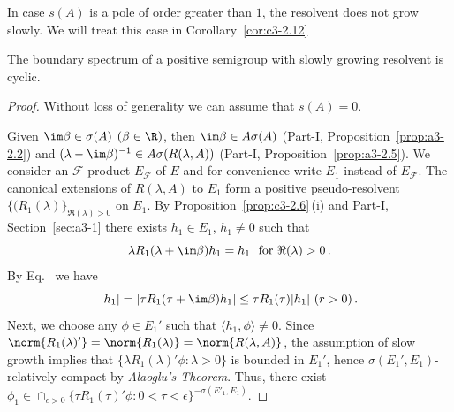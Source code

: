 In case $s(A)$ is a pole of order greater than $1$, the resolvent does not grow slowly.
We will treat this case in Corollary~\ref{cor:c3-2.12}
\begin{theorem}\label{thm:c3-2.10}
	The boundary spectrum of a positive semigroup with slowly growing resolvent is cyclic.
\end{theorem}
\begin{proof}
Without loss of generality we can assume that $s(A) = 0$.

Given $\im\beta \in \sigma(A)$ $(\beta \in \R )$, then $\im\beta \in A\sigma(A)$ (Part-I, Proposition~\ref{prop:a3-2.2}) and $(\lambda-\im\beta)^{-1} \in A\sigma(R(\lambda,A))$ (Part-I, Proposition~\ref{prop:a3-2.5}).
We consider an $\mathcal{F}$-product $E_{\mathcal{F}}$ of\/ $E$ and for convenience write $E_{1}$ instead of\/ $E_{\mathcal{F}}$.
The canonical extensions of\/ $R(\lambda,A)$ to $E_{1}$ form a positive pseudo-resolvent $\{(R_{1}(\lambda)\}_{\Re(\lambda)>0}$ on $E_{1}$.
By Proposition~\ref{prop:c3-2.6}\,(i) and Part-I, Section~\ref{sec:a3-1} there exists $h_{1} \in E_{1}$, $h_{1} \neq 0$ such that
\begin{equation}\textstyle\label{eq:c3-2.16}
	\lambda R_{1}(\lambda+\im\beta)h_{1} = h_{1} \ \text{ for }  \Re(\lambda) > 0\,.
\end{equation}
By Eq.~ we have
\begin{equation}\label{eq:c3-2.17}\textstyle
	|h_{1}| = |\tau R_{1}(\tau+\im\beta)h_{1}| \leq \tau R_{1}(\tau)|h_{1}| \ (r > 0)\,.
\end{equation}
Next, we choose any $\phi \in E_{1}'$ such that $\langle  h_{1},\phi \rangle \neq 0$.
Since $\norm{R_{1}(\lambda)'} = \norm{R_{1}(\lambda)} = \norm{R(\lambda,A)}$, the assumption of slow growth implies that $\{\lambda R_{1}(\lambda)'\phi \colon \lambda > 0\}$ is bounded in $E_{1}'$, hence $\sigma(E_{1}',E_{1})$-relatively compact by \emph{Alaoglu's Theorem}.
Thus, there exist $\phi_{1} \in \cap_{\epsilon>0}\{\tau R_{1}(\tau)'\phi \colon 0<\tau<\epsilon\}^{-\sigma(E'_1,E_1)}$.


\end{proof}
